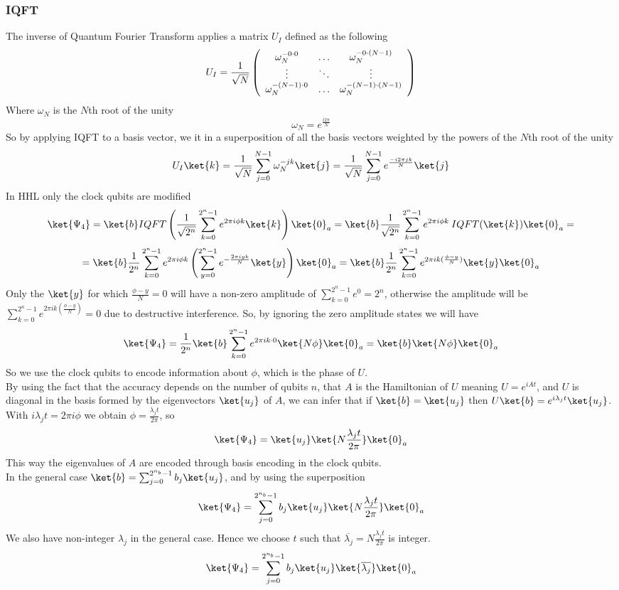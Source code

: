 \documentclass[10pt]{article}
\begin{document}
\subsubsection{IQFT}
The inverse of Quantum Fourier Transform applies a matrix $U_I$ defined as the following
$$U_I=\frac{1}{\sqrt{N}}\left(
	\begin{array}{c c c}
		\omega_N^{-0\cdot 0}&\ldots&\omega_N^{-0\cdot (N-1)}\\
		\vdots&\ddots&\vdots\\
		\omega_N^{-(N-1)\cdot 0}&\ldots&\omega_N^{-(N-1)\cdot(N-1)}
	\end{array}
\right)$$
Where $\omega_N$ is the $N$th root of the unity
$$\omega_N=e^{\frac{i2\pi}{N}}$$
So by applying IQFT to a basis vector, we it in a superposition of all the basis vectors weighted by the powers of the $N$th root of the unity
$$U_I\ket{k}=\frac{1}{\sqrt{N}}\sum_{j=0}^{N-1}\omega_N^{-jk}\ket{j} = \frac{1}{\sqrt{N}}\sum_{j=0}^{N-1}e^{\frac{-i2\pi jk}{N}}\ket{j}$$
In HHL only the clock qubits are modified
$$\ket{\Psi_4} = \ket{b}IQFT\left(\frac{1}{\sqrt{2^n}}\sum_{k=0}^{2^n-1}e^{2\pi i\phi k}\ket{k}\right)\ket{0}_a= \ket{b}\frac{1}{\sqrt{2^n}}\sum_{k=0}^{2^n-1}e^{2\pi i\phi k}\:IQFT(\ket{k})\ket{0}_a=$$
$$=\ket{b}\frac{1}{2^n}\sum_{k=0}^{2^n-1}e^{2\pi i\phi k}\left(\sum_{y=0}^{2^n-1} e^{-\frac{2\pi iyk}{N}}\ket{y}\right)\ket{0}_a =\ket{b}\frac{1}{2^n}\sum_{k=0}^{2^n-1}e^{2\pi ik(\frac{\phi-y}{N})}\ket{y}\ket{0}_a$$
Only the $\ket{y}$ for which $\frac{\phi - y}{N} = 0$ will have a non-zero amplitude of $\sum_{k=0}^{2^n-1}e^{0} = 2^n$, otherwise the amplitude will be $\sum_{k=0}^{2^n-1}e^{2\pi ik(\frac{\phi-y}{N})}=0$ due to destructive interference. So, by ignoring the zero amplitude states we will have
$$\ket{\Psi_4}=\frac{1}{2^n}\ket{b}\sum_{k=0}^{2^n-1}e^{2\pi ik\cdot 0}\ket{N\phi}\ket{0}_a = \ket{b}\ket{N\phi}\ket{0}_a$$
So we use the clock qubits to encode information about $\phi$, which is the phase of $U$.\\
By using the fact that the accuracy depends on the number of qubits $n$, that $A$ is the Hamiltonian of $U$ meaning $U = e^{iAt}$, and $U$ is diagonal in the basis formed by the eigenvectors $\ket{u_j}$ of $A$, we can infer that if $\ket{b}=\ket{u_j}$ then $U\ket{b}=e^{i\lambda_jt}\ket{u_j}$. With $i\lambda_jt=2\pi i\phi$ we obtain $\phi = \frac{\lambda_jt}{2\pi}$, so
$$\ket{\Psi_4}=\ket{u_j}\ket{N\frac{\lambda_jt}{2\pi}}\ket{0}_a$$
This way the eigenvalues of $A$ are encoded through basis encoding in the clock qubits.\\
In the general case $\ket{b} = \sum_{j=0}^{2^{n_b}-1}b_j\ket{u_j}$, and by using the superposition
$$\ket{\Psi_4}=\sum_{j=0}^{2^{n_b}-1}b_j\ket{u_j}\ket{N\frac{\lambda_jt}{2\pi}}\ket{0}_a$$
We also have non-integer $\lambda_j$ in the general case. Hence we choose $t$ such that $\overline{\lambda_j}=N\frac{\lambda_jt}{2\pi}$ is integer.
$$\ket{\Psi_4}=\sum_{j=0}^{2^{n_b}-1}b_j\ket{u_j}\ket{\overline{\lambda_j}}\ket{0}_a$$
\end{document}
